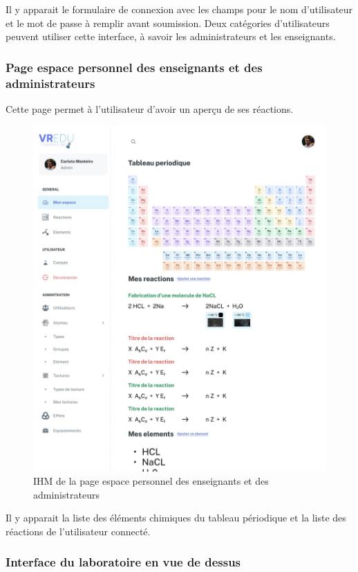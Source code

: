 Il y apparait le formulaire de connexion avec les champs pour le nom d'utilisateur et le mot de passe à remplir avant soumission.
Deux catégories d'utilisateurs peuvent utiliser cette interface, à savoir les administrateurs et les enseignants.

\subsubsection{Page espace personnel des enseignants et des administrateurs}

Cette page permet à l'utilisateur d'avoir un aperçu de ses réactions.

\begin{figure}[H]
	\centering
	\includegraphics[width=1\textwidth]{img/esp}
	\caption{IHM de la page espace personnel des enseignants et des administrateurs}
	\label{fig:mesh1}
\end{figure}

Il y apparait la liste des éléments chimiques du tableau périodique et la liste des réactions de l'utilisateur connecté.

\subsubsection{Interface du laboratoire en vue de dessus}

